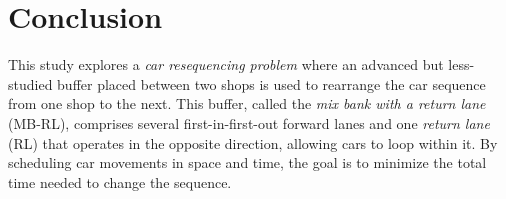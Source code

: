 \documentclass[12pt]{article}
\begin{document}
\section{Conclusion}\label{sec6}
This study explores a \textit{car resequencing problem} where an advanced but less-studied buffer placed between two shops is used to rearrange the car sequence from one shop to the next. This buffer, called the \textit{mix bank with a return lane} (MB-RL), comprises several first-in-first-out forward lanes and one \textit{return lane} (RL) that operates in the opposite direction, allowing cars to loop within it. By scheduling car movements in space and time, the goal is to minimize the total time needed to change the sequence.



\end{document}
